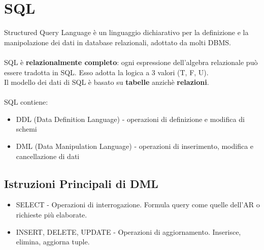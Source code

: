 \documentclass[12pt, a4paper]{article}
\begin{document}
    \section{SQL}
    Structured Query Language è un linguaggio dichiarativo per la definizione e la manipolazione dei dati in database 
    relazionali, adottato da molti DBMS.
    \\\\
    SQL è \textbf{relazionalmente completo}: ogni espressione dell'algebra relazionale
    può essere tradotta in SQL. Esso adotta la logica a 3 valori (T, F, U).
    \\Il modello dei dati di SQL è basato su \textbf{tabelle} anzichè \textbf{relazioni}.
    \\\\SQL contiene:
    \begin{itemize}
        \item DDL (Data Definition Language) - operazioni di definizione e modifica di schemi
        \item DML (Data Manipulation Language) - operazioni di inserimento, modifica e cancellazione di dati
    \end{itemize}

    \subsection*{Istruzioni Principali di DML}
    \begin{itemize}
        \item SELECT - Operazioni di interrogazione. Formula query come quelle dell'AR o richieste più elaborate.
        \item INSERT, DELETE, UPDATE - Operazioni di aggiornamento. Inserisce, elimina, aggiorna tuple.
    \end{itemize}
\end{document}
